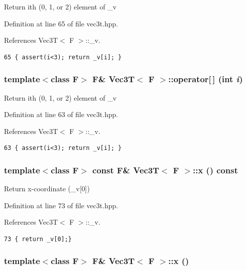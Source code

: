 Return ith (0, 1, or 2) element of \_\-v 

Definition at line 65 of file vec3t.hpp.

References Vec3T$<$ F $>$::\_\-v.

\footnotesize\begin{verbatim}65 { assert(i<3); return _v[i]; }
\end{verbatim}\normalsize 


\subsubsection{\setlength{\rightskip}{0pt plus 5cm}template$<$class F$>$ F\& {\bf Vec3T}$<$ F $>$::operator[$\,$] (int {\em i})\hspace{0.3cm}{\tt  [inline]}}\label{classVec3T_afa3b3be64f86f689de4bf05a470fc17_afa3b3be64f86f689de4bf05a470fc17}


Return ith (0, 1, or 2) element of \_\-v 

Definition at line 63 of file vec3t.hpp.

References Vec3T$<$ F $>$::\_\-v.

\footnotesize\begin{verbatim}63 { assert(i<3); return _v[i]; }
\end{verbatim}\normalsize 


\subsubsection{\setlength{\rightskip}{0pt plus 5cm}template$<$class F$>$ const F\& {\bf Vec3T}$<$ F $>$::x () const\hspace{0.3cm}{\tt  [inline]}}\label{classVec3T_48b18a21fef9634230ceceb1ae474d7b_48b18a21fef9634230ceceb1ae474d7b}


Return x-coordinate (\_\-v[0]) 

Definition at line 73 of file vec3t.hpp.

References Vec3T$<$ F $>$::\_\-v.

\footnotesize\begin{verbatim}73 { return _v[0];}
\end{verbatim}\normalsize 


\subsubsection{\setlength{\rightskip}{0pt plus 5cm}template$<$class F$>$ F\& {\bf Vec3T}$<$ F $>$::x ()\hspace{0.3cm}{\tt  [inline]}}\label{classVec3T_21935a98327babfb12a213be3f675109_21935a98327babfb12a213be3f675109}


